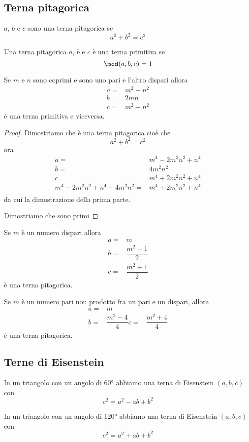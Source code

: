 \subsection{Terna pitagorica}
\begin{definizione}
$a$, $b$ e $c$ sono una terna pitagorica se \[a^2+b^2=c^2\]
\end{definizione}
\begin{definizione}
Una terna pitagorica  $a$, $b$ e $c$ è una terna primitiva se
\[\mcd(a,b,c)=1\]
\end{definizione}
\begin{teorema}
	Se $m$ e $n$ sono coprimi e sono uno pari e l'altro dispari allora
	\begin{align*}
	a=&m^2-n^2\\
	b=&2mn\\
	c=&m^2+n^2
	\end{align*}
	è una terna primitiva e viceversa. 
\end{teorema}
\begin{proof}
	Dimostriamo che è una terna pitagorica cioè che \[a^2+b^2=c^2\]
	ora 
		\begin{align*}
	a=&m^4-2m^2n^2+n^4\\
	b=&4m^2n^2\\
	c=&m^4+2m^2n^2+n^4\\
	m^4-2m^2n^2+n^4+4m^2n^2=&m^4+2m^2n^2+n^4\\
	\end{align*}
	da cui la dimostrazione della prima parte. 
	
	Dimostriamo che sono primi
\end{proof}
\begin{teorema}
	Se $m$ è un numero dispari allora
		\begin{align*}
	a=&m\\
	b=&\dfrac{m^2-1}{2} \\
	c=&\dfrac{m^2+1}{2}
	\end{align*}
	è una terna pitagorica.\par
		Se $m$ è un numero pari non prodotto fra un pari e un dispari, allora
	\begin{align*}
	a=&m\\
	b=&\dfrac{m^2-4}{4} 
	c=&\dfrac{m^2+4}{4}
	\end{align*}
		è una terna pitagorica.
\end{teorema}
\subsection{Terne di Eisenstein}
In un triangolo con un angolo  di $\ang{60}$
abbiamo una terna di Eisenstein $(a,b,c)$ con
\begin{equation*}
	c^2=a^2-ab+b^2
\end{equation*}

In un triangolo con un angolo  di $\ang{120}$
abbiamo una terna di Eisenstein $(a,b,c)$ con
\begin{equation*}
	c^2=a^2+ab+b^2
\end{equation*}